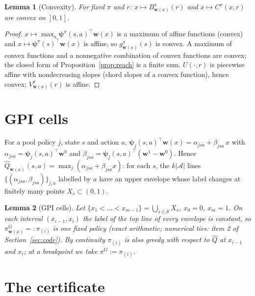 \documentclass[11pt]{article}
\newcommand{\vpsi}{\bm{\psi}}
\newcommand{\w}{\mathbf{w}}
\newcommand{\cS}{\mathcal S}
\newcommand{\cA}{\mathcal A}
\newtheorem{lemma}{Lemma}
\theoremstyle{definition}
\begin{document}
\begin{lemma}[Convexity]\label{lem:convex}
For fixed $\pi$ and $r$: $x\mapsto B^\pi_{\w(x)}(r)$ and $x\mapsto C^\pi(x,r)$ are convex on $[0,1]$.
\end{lemma}
\begin{proof}
$x\mapsto\max_a\vpsi^\pi(s,a)^\top\w(x)$ is a maximum of affine functions (convex) and
$x\mapsto\vpsi^\pi(s)^\top\w(x)$ is affine, so $g^\pi_{\w(x)}(s)$ is convex. A maximum of convex functions and a
nonnegative combination of convex functions are convex; the closed form of Proposition~\ref{prop:reach} is a finite
sum. $U(\cdot,r)$ is piecewise affine with nondecreasing slopes (chord slopes of a convex function), hence convex;
$V^\pi_{\w(x)}(r)$ is affine.
\end{proof}

\section{GPI cells}

For a pool policy $j$, state $s$ and action $a$, $\vpsi_j(s,a)^\top\w(x)=\alpha_{jsa}+\beta_{jsa}\,x$ with
$\alpha_{jsa}=\vpsi_j(s,a)^\top\w^0$ and $\beta_{jsa}=\vpsi_j(s,a)^\top(\w^1-\w^0)$. Hence
$\hat Q_{\w(x)}(s,a)=\max_j(\alpha_{jsa}+\beta_{jsa}x)$: for each $s$, the $k|\cA|$ lines $\{(\alpha_{jsa},\beta_{jsa})\}_{j,a}$
labelled by $a$ have an upper envelope whose label changes at finitely many points $X_s\subset(0,1)$.

\begin{lemma}[GPI cells]\label{lem:cells}
Let $\{x_1<\dots<x_{m-1}\}=\bigcup_{s\in\cS}X_s$, $x_0=0$, $x_m=1$. On each interval $(x_{i-1},x_i)$ the label of the top line of every
envelope is constant, so $\pi^G_{\w(x)}=:\pi_{(i)}$ is one fixed policy (exact arithmetic; numerical ties: item 2
of Section~\ref{sec:code}). By continuity $\pi_{(i)}$ is also greedy with respect to $\hat Q$ at $x_{i-1}$ and $x_i$; at a
breakpoint we take $\pi^G:=\pi_{(i)}$.
\end{lemma}

\section{The certificate}
\end{document}
